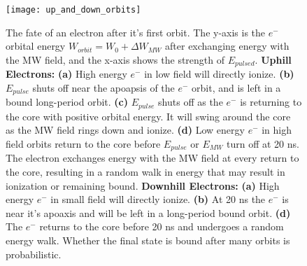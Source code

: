 \documentclass[aps,pra,preprint,groupedaddress]{revtex4-1}
\begin{document}




\begin{figure}
	\texttt{[image: up\_and\_down\_orbits]}
	\caption{The fate of an electron after it's first orbit. The y-axis is the $e^-$ orbital energy $W_{orbit} = W_0 + \Delta W_{MW}$ after exchanging energy with the MW field, and the x-axis shows the strength of $E_{pulsed}$. \textbf{Uphill Electrons:} \textbf{(a)} High energy $e^-$ in low field will directly ionize. \textbf{(b)} $E_{pulse}$ shuts off near the apoapsis of the $e^-$ orbit, and is left in a bound long-period orbit. \textbf{(c)} $E_{pulse}$ shuts off as the $e^-$ is returning to the core with positive orbital energy. It will swing around the core as the MW field rings down and ionize. \textbf{(d)} Low energy $e^-$ in high field orbits return to the core before $E_{pulse}$ or $E_{MW}$ turn off at 20 ns. The electron exchanges energy with the MW field at every return to the core, resulting in a random walk in energy that may result in ionization or remaining bound. \textbf{Downhill Electrons:} \textbf{(a)} High energy $e^-$ in small field will directly ionize. \textbf{(b)} At 20 ns the $e^-$ is near it's apoaxis and will be left in a long-period bound orbit. \textbf{(d)} The $e^-$ returns to the core before 20 ns and undergoes a random energy walk. Whether the final state is bound after many orbits is probabilistic.}
	\label{fig:orbits}	
\end{figure}
\end{document}
